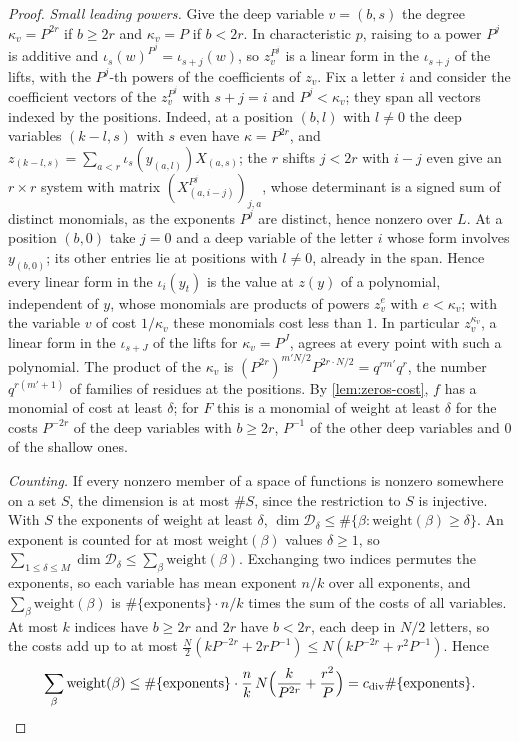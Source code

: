 \begin{proof}
\emph{Small leading powers.} Give the deep variable $v=(b,s)$ the degree $\kappa_v=P^{2r}$ if $b\ge2r$ and $\kappa_v=P$ if $b<2r$. In characteristic $p$, raising to a power $P^j$ is additive and $\iota_s(w)^{P^j}=\iota_{s+j}(w)$, so $z_v^{P^j}$ is a linear form in
the $\iota_{s+j}$ of the lifts, with the $P^j$-th powers of the coefficients of $z_v$. Fix a letter $i$ and consider the coefficient vectors of the $z_v^{P^j}$ with $s+j=i$ and $P^j<\kappa_v$; they span all vectors indexed by the positions. Indeed, at a position $(b,l)$
with $l\ne0$ the deep variables $(k-l,s)$ with $s$ even have $\kappa=P^{2r}$, and $z_{(k-l,s)}=\sum_{a<r}\iota_s(y_{(a,l)})X_{(a,s)}$; the $r$ shifts $j<2r$ with $i-j$ even give an $r\times r$ system with matrix $(X_{(a,i-j)}^{P^j})_{j,a}$, whose determinant
is a signed sum of distinct monomials, as the exponents $P^j$ are distinct, hence nonzero over $L$. At a position $(b,0)$ take $j=0$ and a deep variable of the letter $i$ whose form involves $y_{(b,0)}$; its other entries lie at positions with $l\ne0$, already in the
span. Hence every linear form in the $\iota_i(y_t)$ is the value at $z(y)$ of a polynomial, independent of $y$, whose monomials are products of powers $z_v^e$ with $e<\kappa_v$; with the variable $v$ of cost $1/\kappa_v$ these monomials cost less than $1$.
In particular $z_v^{\kappa_v}$, a linear form in the $\iota_{s+J}$ of the lifts for $\kappa_v=P^J$, agrees at every point with such a polynomial. The product of the $\kappa_v$ is $(P^{2r})^{m'N/2}P^{2r\cdot N/2}=q^{rm'}q^r$, the number $q^{r(m'+1)}$ of families of residues at the
positions. By \cref{lem:zeros-cost}, $f$ has a monomial of cost at least $\delta$; for $F$ this is a monomial of weight at least $\delta$ for the costs $P^{-2r}$ of the deep variables with $b\ge2r$, $P^{-1}$ of the other deep variables and $0$ of the
shallow ones.

\emph{Counting.} If every nonzero member of a space of functions is nonzero somewhere on a set $S$, the dimension is at most $\#S$, since the restriction to $S$ is injective. With $S$ the exponents of weight at least $\delta$,
$\dim\mathcal D_\delta\le\#\{\beta:\mathrm{weight}(\beta)\ge\delta\}$. An exponent is counted for at most $\mathrm{weight}(\beta)$ values $\delta\ge1$, so $\sum_{1\le\delta\le M}\dim\mathcal D_\delta\le\sum_\beta\mathrm{weight}(\beta)$. Exchanging two indices permutes the
exponents, so each variable has mean exponent $n/k$ over all exponents, and $\sum_\beta\mathrm{weight}(\beta)$ is $\#\{\text{exponents}\}\cdot n/k$ times the sum of the costs of all variables. At most $k$ indices have $b\ge2r$ and $2r$ have $b<2r$, each deep in
$N/2$ letters, so the costs add up to at most $\frac N2(kP^{-2r}+2rP^{-1})\le N(kP^{-2r}+r^2P^{-1})$. Hence
\[
  \sum_\beta\mathrm{weight}(\beta)\le\#\{\text{exponents}\}\cdot\frac nk\,N\Bigl(\frac k{P^{2r}}+\frac{r^2}P\Bigr)=c_{\rm div}\#\{\text{exponents}\}.\qedhere
\]
\end{proof}

